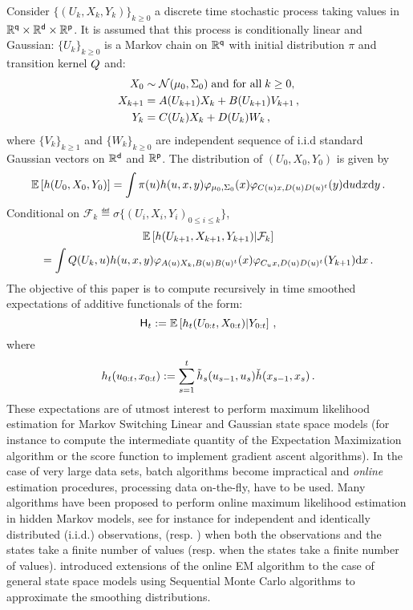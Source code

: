 Consider $\{(U_k,X_k,Y_k)\}_{k\ge 0}$ a discrete time stochastic process taking values in $\mathbb{R}^{\mathsf{q}}\times\mathbb{R}^{\mathsf{d}}\times\mathbb{R}^{\mathsf{p}}$. It is assumed that this process is conditionally linear and Gaussian: $\{U_k\}_{k\ge 0}$ is a Markov chain on $\mathbb{R}^{\mathsf{q}}$ with initial distribution $\pi$ and transition kernel $Q$ and: 
\begin{align*}
X_0&\sim \mathcal{N}(\mu_0,\Sigma_0)\;\mbox{and for all}\; k\ge 0,\\
X_{k+1 }& = A(U_{k+1})X_{k} + B(U_{k+1})V_{k+1}\,,\\ 
Y_k & = C(U_k)X_{k} + D(U_k)W_k\,,
\end{align*}
where $\{V_k\}_{k\ge 1}$ and $\{W_k\}_{k\ge 0}$ are independent sequence of i.i.d standard Gaussian vectors on $\mathbb{R}^{\mathsf{d}}$ and $\mathbb{R}^{\mathsf{p}}$. The distribution of $(U_0,X_0,Y_0)$ is given by 
\[
\mathbb{E}\left[h(U_0,X_0,Y_0)\right] = \int \pi(u)h(u,x,y)\varphi_{\mu_0,\Sigma_0}(x)\varphi_{C(u)x,D(u)D(u)^t}(y)\mathrm{d} u\mathrm{d} x\mathrm{d} y\,.
\]
Conditional on $\mathcal{F}_{k} \eqdef \sigma\{(U_i,X_i,Y_i)_{0\le i \le k}\}$,
\begin{multline*}
\mathbb{E}\left[h(U_{k+1},X_{k+1},Y_{k+1})\middle| \mathcal{F}_{k}\right] \\
= \int Q(U_{k},u)h(u,x,y)\varphi_{A(u)X_k,B(u)B(u)^t}(x)\varphi_{C_{u}x,D(u)D(u)^t}(Y_{k+1})\mathrm{d} x\,.
\end{multline*}
The objective of this paper is to compute recursively in time smoothed expectations of additive functionals of the form:
\begin{equation}
\label{eq:add:func:smoothed}
\mathsf{H}_t := \mathbb{E}\left[h_t(U_{0:t},X_{0:t})\middle|Y_{0:t}\right]\,,
\end{equation} 
where
\begin{equation}
\label{eq:add:func}
h_t(u_{0:t},x_{0:t}) := \sum_{s=1}^{t}\tilde{h}_s(u_{s-1},u_s)\check{h}(x_{s-1},x_s) \,.
\end{equation}
These expectations are of utmost interest to perform maximum likelihood estimation for Markov Switching Linear and Gaussian state space models (for instance to compute the intermediate quantity of the Expectation Maximization algorithm or the score function to implement gradient ascent algorithms). In the case of very large data sets, batch algorithms become impractical and {\em online} estimation procedures, processing data on-the-fly, have to be used. Many algorithms have been proposed to perform online maximum likelihood estimation in hidden Markov models, see for instance \cite{cappe:moulines:2009} for independent and identically distributed (i.i.d.) observations, \cite{mongillo:deneve:2008} (resp. \cite{cappe:2011}) when both the observations and the states take a finite number of values (resp. when the states take a finite number of values). \citet{cappe:2009,delmoral:doucet:singh:2010a,lecorff:fort:moulines:2011} introduced extensions of the online EM algorithm to the case of general state space models using Sequential Monte Carlo algorithms to approximate the smoothing distributions. 
